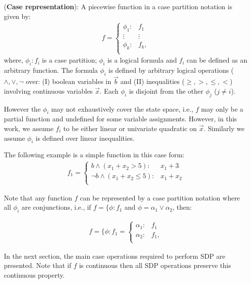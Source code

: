 \documentclass[twoside,11pt]{article}
\newenvironment{mydef}[1][Definition]{\begin{trivlist}
\item[\hskip \labelsep {\bfseries #1}]}{\end{trivlist}}
\begin{document}
\begin{mydef}(\textbf{Case representation}): 
\label{defCase}
A piecewise function in a case partition notation is given by:
{%
\begin{align*}
f = 
\begin{cases}
  \phi_1: & f_1 \\ 
 \vdots&\vdots\\ 
  \phi_k: & f_k, \\ 
\end{cases}
\end{align*}
}
where, $\phi_i: f_i$ is a case partition; $\phi_i$ is a logical formula and $f_i$ can be defined as an arbitrary function. The formula $\phi_i$ is defined by arbitrary logical operations ($\land,\lor,\neg$ over: 
(I) boolean variables in $\vec{b}$ and (II) 
inequalities ($\geq,>,\leq,<$) involving continuous variables $\vec{x}$. 
Each $\phi_i$ is disjoint from the other $\phi_j$ ($j \neq i$). 

However the $\phi_i$ may not exhaustively cover the state space, i.e., $f$ may only be a partial function and undefined for some variable assignments. 
However, in this work, we assume $f_i$ to be either linear or univariate quadratic on $\vec{x}$. Similarly we assume $\phi_i$ is defined over linear inequalities.
\end{mydef}

The following example is a simple function in this case form: 
\begin{align*}
f_1 = 
\begin{cases}
b \wedge (x_1+x_2 >5) : & x_1+3 \\ 
\neg b \wedge (x_1+x_2 \leq 5) : & x_1+x_2 \\ 
\end{cases} 
\end{align*}

Note that any function $f$ can be represented by a case partition notation where all $\phi_i$ are conjunctions, i.e., if $f=\{\phi: f_1$ and $\phi= \alpha_1 \vee \alpha_2$, then:

\begin{align*}
f =\{ \phi:f_1 =
\begin{cases}
  \alpha_1: & f_1 \\ 
  \alpha_2: & f_1, \\ 
\end{cases}
\end{align*}




In the next section, the main case operations required to perform SDP are presented. Note that if $f$ is continuous then all SDP operations preserve this continuous property. 
\end{document}
